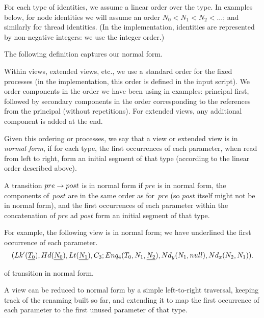For each type of identities, we assume a linear order over the type.  In
examples below, for node identities we will assume an order $N_0 < N_1 <
N_2 < \ldots$; and similarly for thread identities.  (In the implementation,
identities are represented by non-negative integers: we use the integer
order.)

The following definition captures our normal form.
%
\begin{definition}
Within views, extended views, etc., we use a standard order for the fixed
processes (in the implementation, this order is defined in the input script).
We order components in the order we have been using in examples: principal
first, followed by secondary components in the order corresponding to the
references from the principal (without repetitions).  For extended views, any
additional component is added at the end.  

Given this ordering or processes, we say that a view or extended view is in
\emph{normal form}, if for each type, the first occurrences of each parameter,
when read from left to right, form an initial segment of that type (according
to the linear order described above).

A transition $pre \stackrel{}\rightarrow post$ is in normal form if $pre$ is in normal form,
the components of~$post$ are in the same order as for~$pre$ (so $post$ itself
might not be in normal form), and the first occurrences of each parameter
within the concatenation of $pre$ ad $post$ form an initial segment of that
type.
\end{definition}

For example, the following view is in normal form; we have underlined the
first occurrence of each parameter.
\[
\begin{align}
(Lk'(\underline{T_0}), Hd(\underline{N_0}), 
    Lt(\underline{N_1}), C_3; 
  Enq_4(T_0, N_1, \underline{N_2}), Nd_y(N_1, null),Nd_x(N_2, N_1)) .
\end{align}
\]

 of transition in normal form. 

A view can be reduced to normal form by a simple left-to-right traversal,
keeping track of the renaming built so far, and extending it to map the first
occurrence of each parameter to the first unused parameter of that type.

